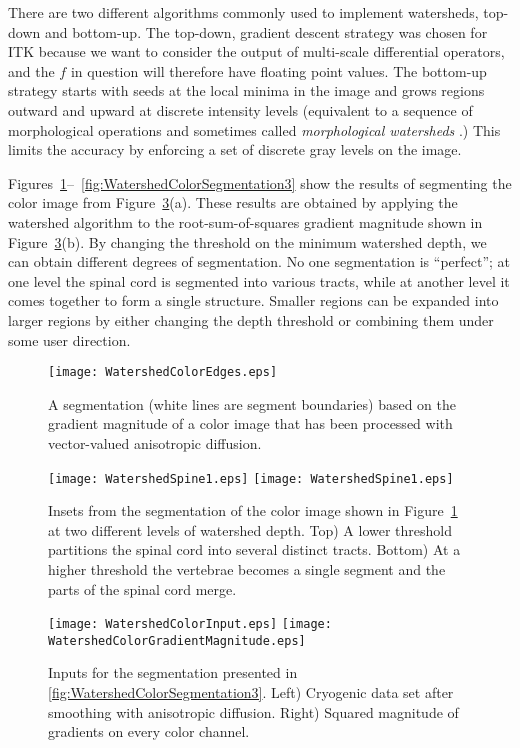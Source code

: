 There are two different algorithms commonly used to implement watersheds,
top-down and bottom-up.  The top-down, gradient descent strategy was chosen for
ITK because we want to consider the output of multi-scale differential
operators, and the $f$ in question will therefore have floating point
values. The bottom-up strategy starts with seeds at the local minima in the
image and grows regions outward and upward at discrete intensity levels
(equivalent to a sequence of morphological operations and sometimes called {\em
morphological watersheds} \cite{Serra1982}.) This limits the accuracy by
enforcing a set of discrete gray levels on the image.

Figures~\ref{fig:WatershedColorSegmentation1}--~\ref{fig:WatershedColorSegmentation3}
show the results of segmenting the color image from
Figure~\ref{fig:WatershedColorInput}(a).  These results are obtained by
applying the watershed algorithm to the root-sum-of-squares gradient magnitude
shown in Figure~\ref{fig:WatershedColorInput}(b).  By changing the threshold on
the minimum watershed depth, we can obtain different degrees of segmentation.
No one segmentation is ``perfect''; at one level the spinal cord is segmented
into various tracts, while at another level it comes together to form a single
structure.  Smaller regions can be expanded into larger regions by either
changing the depth threshold or combining them under some user direction.

\begin{figure}
\centering
\texttt{[image: WatershedColorEdges.eps]}
\caption{
A segmentation (white lines are segment boundaries) based on 
the gradient magnitude of a color image that has been processed with 
vector-valued anisotropic diffusion.}
\protect\label{fig:WatershedColorSegmentation1}
\end{figure}
\begin{figure}
\centering
\texttt{[image: WatershedSpine1.eps]}
\texttt{[image: WatershedSpine1.eps]}
\caption{
Insets from the segmentation of the color image shown in 
Figure~\protect\ref{fig:WatershedColorSegmentation1} at two different levels of 
watershed depth.  Top) A lower threshold partitions the spinal cord
into several distinct tracts.  Bottom) At a higher threshold the 
vertebrae becomes a single segment and the parts of the 
spinal cord merge.
}
\protect\label{fig:WatershedColorSegmentation2}
\end{figure}

\begin{figure}
\centering
\texttt{[image: WatershedColorInput.eps]}
\texttt{[image: WatershedColorGradientMagnitude.eps]}
\caption{
Inputs for the segmentation presented in \ref{fig:WatershedColorSegmentation3}.
Left) Cryogenic data set after smoothing with anisotropic diffusion.  Right)
Squared magnitude of gradients on every color channel.}
\protect\label{fig:WatershedColorInput}
\end{figure}


